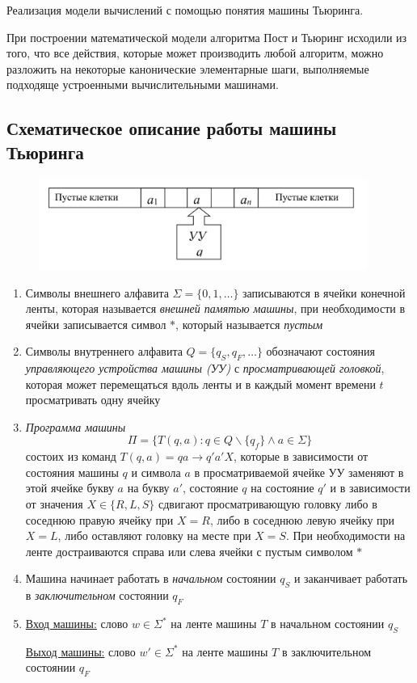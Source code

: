 Реализация модели вычислений с помощью понятия машины Тьюринга.

При построении математической модели алгоритма Пост и 
Тьюринг исходили из того, что все действия, которые может 
производить любой алгоритм, можно разложить на некоторые 
канонические элементарные шаги, выполняемые подходяще 
устроенными вычислительными машинами. 

\subsection*{Схематическое описание работы машины Тьюринга}
\begin{figure}[H]
    \centering
    \includegraphics[height = 3cm]{images/machine.png}
\end{figure}

\begin{enumerate}
    \item Символы внешнего алфавита $\Sigma=\{0,1,\ldots\}$ записываются в ячейки конечной ленты, которая называется \textit{внешней памятью машины}, при необходимости в ячейки записывается символ $*$, который называется \textit{пустым}

    \item Символы внутреннего алфавита $Q = \{q_S,q_F,\ldots\}$ обозначают состояния \textit{управляющего устройства машины (УУ)} с \textit{просматривающей головкой}, которая может перемещаться вдоль ленты и в каждый момент времени $t$ просматривать одну ячейку

    \item \textit{Программа машины}
    $$\Pi = \{T(q,a):q\in Q\backslash \{q_f\}\land a\in\Sigma \}$$
    состоих из команд $T(q,a)=qa\rightarrow q'a'X$, которые в зависимости от состояния машины $q$ и символа $a$ в просматриваемой ячейке УУ заменяют в этой ячейке букву $a$ на букву $a'$, состояние $q$ на состояние $q'$ и в зависимости от значения $X\in\{R,L,S\}$ сдвигают просматривающую головку либо в соседнюю правую ячейку при $X=R$, либо в соседнюю левую ячейку при $X=L$, либо оставляют головку на месте при $X=S$. При необходимости на ленте достраиваются справа или слева ячейки с пустым символом $*$

    \item Машина начинает работать в \textit{начальном} состоянии $q_S$ и заканчивает работать в \textit{заключительном} состоянии $q_F$

    \item \underline{Вход машины:} слово $w\in\Sigma^*$ на ленте машины $T$ в начальном состоянии $q_S$
    
    \underline{Выход машины:} слово $w'\in\Sigma^*$ на ленте машины $T$ в заключительном состоянии $q_F$
\end{enumerate}

